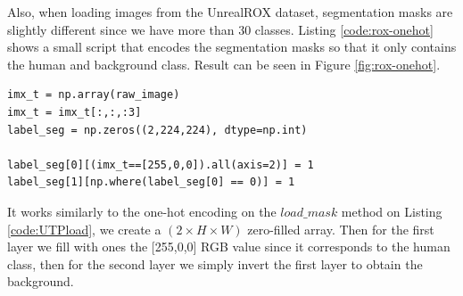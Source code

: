 Also, when loading images from the UnrealROX dataset, segmentation masks are slightly different since we have more than 30 classes. Listing \ref{code:rox-onehot} shows a small script that encodes the segmentation masks so that it only contains the human and background class. Result can be seen in Figure \ref{fig:rox-onehot}.

\begin{lstlisting}[style=Python-color, caption=Preprocessing the UnrealROX segmentation masks, frame=single, label=code:rox-onehot]
imx_t = np.array(raw_image)
imx_t = imx_t[:,:,:3]
label_seg = np.zeros((2,224,224), dtype=np.int)

label_seg[0][(imx_t==[255,0,0]).all(axis=2)] = 1
label_seg[1][np.where(label_seg[0] == 0)] = 1

\end{lstlisting}

It works similarly to the one-hot encoding on the $load\_mask$ method on Listing \ref{code:UTPload}, we create a $(2 \times H \times W)$ zero-filled array. Then for the first layer we fill with ones the [255,0,0] RGB value since it corresponds to the human class, then for the second layer we simply invert the first layer to obtain the background.

